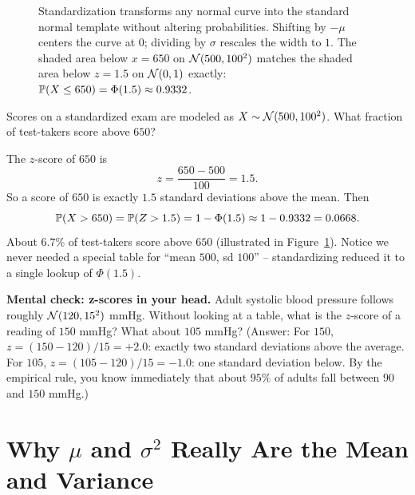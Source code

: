 \begin{figure}[H]
\caption{Standardization transforms any normal curve into the standard normal template without altering probabilities. Shifting by $-\mu$ centers the curve at $0$; dividing by $\sigma$ rescales the width to $1$. The shaded area below $x = 650$ on $\Normal(500,100^2)$ matches the shaded area below $z = 1.5$ on $\Normal(0,1)$ exactly: $\P(X \le 650) = \Phi(1.5) \approx 0.9332$.}
\label{ch12:fig-standardize}
\end{figure}

\begin{example}
\label{ch12:ex-zscore}
Scores on a standardized exam are modeled as $X \sim \Normal(500, 100^2)$. What
fraction of test-takers score above $650$?

The $z$-score of $650$ is
\[
  z = \frac{650 - 500}{100} = 1.5.
\]
So a score of $650$ is exactly $1.5$ standard deviations above the mean. Then
\[
  \P(X > 650) = \P(Z > 1.5) = 1 - \Phi(1.5) \approx 1 - 0.9332 = 0.0668.
\]
About $6.7\%$ of test-takers score above $650$ (illustrated in Figure~\ref{ch12:fig-standardize}). Notice we never needed a special
table for ``mean $500$, sd $100$'' -- standardizing reduced it to a single lookup
of $\Phi(1.5)$.
\end{example}

\begin{walkbox}
\textbf{Mental check: z-scores in your head.}
Adult systolic blood pressure follows roughly $\Normal(120, 15^2)$ mmHg.
Without looking at a table, what is the $z$-score of a reading of $150$ mmHg?
What about $105$ mmHg?
(Answer: For $150$, $z = (150 - 120)/15 = +2.0$: exactly two standard deviations above the average. For $105$, $z = (105 - 120)/15 = -1.0$: one standard deviation below. By the empirical rule, you know immediately that about $95\%$ of adults fall between $90$ and $150$ mmHg.)
\end{walkbox}

\section{Why $\mu$ and $\sigma^2$ Really Are the Mean and Variance}
\label{ch12:moments}

